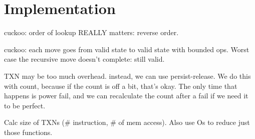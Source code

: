 \section{Implementation}

cuckoo:
order of lookup REALLY matters: reverse order.




cuckoo: each move goes from valid state to valid state with bounded
ops. Worst case the recursive move doesn't complete: still valid.

TXN may be too much overhead. instead, we can use persist-release. We do this
with count, because if the count is off a bit, that's okay. The only time that
happens is power fail, and we can recalculate the count after a fail if we need
it to be perfect.



Calc size of TXNs (# instruction, # of mem access). Also use Os to reduce just
those functions.




